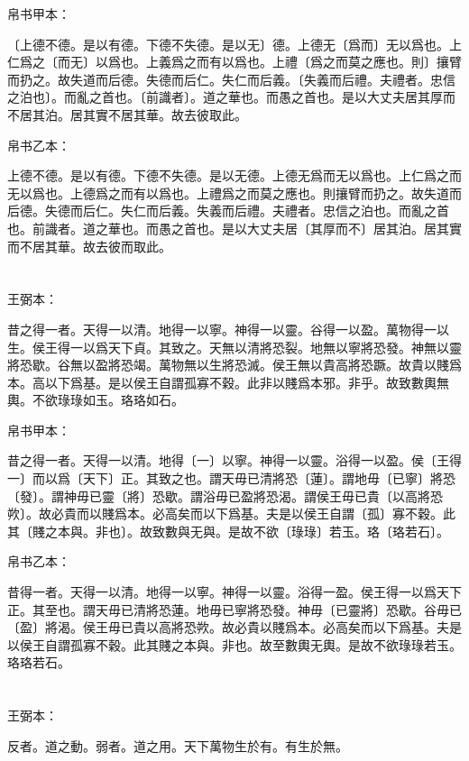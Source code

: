 \documentclass[a5paper]{ctexbook}
\begin{document}
    
    帛书甲本：

    〔上德不德。是以有德。下德不失德。是以无〕德。上德无〔爲而〕无以爲也。上仁爲之〔而无〕以爲也。上義爲之而有以爲也。上禮〔爲之而莫之應也。則〕攘臂而扔之。故失道而后德。失德而后仁。失仁而后義。〔失義而后禮。夫禮者。忠信之泊也〕。而亂之首也。〔前識者〕。道之華也。而愚之首也。是以大丈夫居其厚而不居其泊。居其實不居其華。故去彼取此。

    帛书乙本：

    上德不德。是以有德。下德不失德。是以无德。上德无爲而无以爲也。上仁爲之而无以爲也。上德爲之而有以爲也。上禮爲之而莫之應也。則攘臂而扔之。故失道而后德。失德而后仁。失仁而后義。失義而后禮。夫禮者。忠信之泊也。而亂之首也。前識者。道之華也。而愚之首也。是以大丈夫居〔其厚而不〕居其泊。居其實而不居其華。故去彼而取此。

    \chapter{}
    王弼本：

    昔之得一者。天得一以清。地得一以寧。神得一以靈。谷得一以盈。萬物得一以生。侯王得一以爲天下貞。其致之。天無以清將恐裂。地無以寧將恐發。神無以靈將恐歇。谷無以盈將恐竭。萬物無以生將恐滅。侯王無以貴高將恐蹶。故貴以賤爲本。高以下爲基。是以侯王自謂孤寡不穀。此非以賤爲本邪。非乎。故致數輿無輿。不欲琭琭如玉。珞珞如石。

    
    帛书甲本：

    昔之得一者。天得一以清。地得〔一〕以寧。神得一以靈。浴得一以盈。侯〔王得一〕而以爲〔天下〕正。其致之也。謂天毋已清將恐〔蓮〕。謂地毋〔已寧〕將恐〔發〕。謂神毋已靈〔將〕恐歇。謂浴毋已盈將恐渴。謂侯王毋已貴〔以高將恐欮〕。故必貴而以賤爲本。必高矣而以下爲基。夫是以侯王自謂〔孤〕寡不穀。此其〔賤之本與。非也〕。故致數與无與。是故不欲〔琭琭〕若玉。珞〔珞若石〕。

    帛书乙本：

    昔得一者。天得一以清。地得一以寧。神得一以靈。浴得一盈。侯王得一以爲天下正。其至也。謂天毋已清將恐蓮。地毋已寧將恐發。神毋〔已靈將〕恐歇。谷毋已〔盈〕將渴。侯王毋已貴以高將恐欮。故必貴以賤爲本。必高矣而以下爲基。夫是以侯王自謂孤寡不穀。此其賤之本與。非也。故至數輿无輿。是故不欲琭琭若玉。珞珞若石。

    \chapter{}
    王弼本：

    反者。道之動。弱者。道之用。天下萬物生於有。有生於無。
\end{document}
